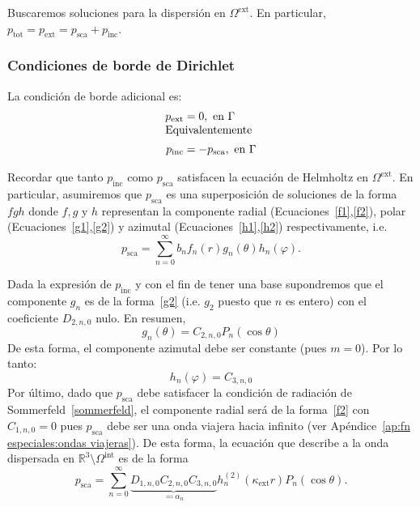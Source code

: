 \documentclass[11pt]{article}
\numberwithin{equation}{section}
\def\R{\mathbb{R}}
\def\tot{\textrm{tot}}
\def\exterior{\textrm{ext}}
\def\interior{\textrm{int}}
\def\inc{\textrm{inc}}
\def\sca{\textrm{sca}}
\begin{document}
Buscaremos soluciones para la dispersión en \(\Omega^{\exterior}\). En particular,
\(p_{\tot} = p_{\exterior} = p_{\sca} + p_{\inc}\).

\subsubsection{Condiciones de borde de Dirichlet}
\label{ssec:a:exterior:dirichlet}

\noindent La condición de borde adicional es:
\begin{align}\label{bc:dirichlet}
	p_{\exterior} &= 0, \text{ en } \Gamma\\[-5pt]
	\intertext{Equivalentemente}
	p_{\inc} &= -p_{\sca}, \text{ en } \Gamma
\end{align}

Recordar que tanto \(p_{\inc}\) como \(p_{\sca}\) satisfacen la ecuación de
Helmholtz en \(\Omega^{\exterior}\). En particular, asumiremos que \(p_{\sca}\) es una
superposición de soluciones de la forma \(fgh\) donde \(f,g\) y \(h\) representan la componente
radial (Ecuaciones~\eqref{f1},\eqref{f2}), polar (Ecuaciones~\eqref{g1},\eqref{g2}) y azimutal
(Ecuaciones~\eqref{h1},\eqref{h2}) respectivamente, i.e.
\begin{displaymath}
	p_{\sca} = \sum_{n=0}^{\infty} b_n f_n(r) g_n(\theta) h_n(\varphi).
\end{displaymath}

Dada la expresión de \(p_{\inc}\) y con el fin de tener
una base supondremos que el componente \(g_n\) es de la forma~\eqref{g2} 
(i.e. \(g_2\) puesto que \(n\) es entero) con el coeficiente \(D_{2,n,0}\) nulo. 
En resumen,
\begin{equation}
\label{psca:g}
	g_n(\theta)
	=
	C_{2,n,0} P_{n} (\cos\theta)
\end{equation}
De esta forma, el componente azimutal debe ser constante (pues \(m=0\)).
Por lo tanto:
\begin{equation}\label{psca:h}
	h_n(\varphi)
	=
	C_{3,n,0}
\end{equation}
Por último, dado que \(p_{\sca}\) debe satisfacer la condición de radiación de
Sommerfeld~\eqref{sommerfeld}, el componente radial será de la forma~\eqref{f2}
con \(C_{1,n,0} = 0\) pues \(p_{\sca}\) debe ser una onda viajera hacia infinito (ver
Apéndice~\ref{ap:fn especiales:ondas viajeras}). De esta forma, la ecuación que
describe a la onda dispersada en \(\R^3\setminus\Omega^{\interior}\) es de la
forma
\begin{equation}\label{psca:forma}
	p_{\sca}
	=
	\sum_{n=0}^{\infty}
	\underbrace{D_{1,n,0} C_{2,n,0} C_{3,n,0}}_{\eqqcolon \alpha_n}
		h_{n}^{(2)}(\kappa_{\exterior} r)
		P_{n}(\cos\theta)
.\end{equation}
\end{document}
